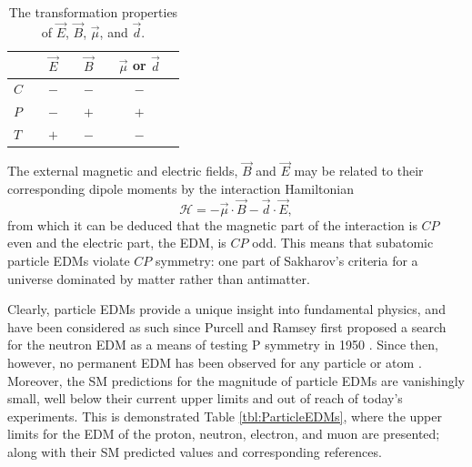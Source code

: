 \begin{table}[h!]
\centering
\begin{tabular}{l|ccc}
\hline
\hline
 & $\vec{E}\quad$ & $\vec{B}\quad$ & $\vec{\mu}$ or $\vec{d}\quad$ \\ 
\hline
 $C\quad$ & $-\quad$ & $-\quad$ & $-\quad$ \\ 
 $P\quad$ & $-\quad$ & $+\quad$ & $+\quad$ \\
 $T\quad$ & $+\quad$ & $-\quad$ & $-\quad$ \\
\hline
\hline
\end{tabular}
\caption{The transformation properties of $\vec{E}$, $\vec{B}$, $\vec{\mu}$, and $\vec{d}$.}
\label{tbl:CPT}
\end{table}

The external magnetic and electric fields, $\vec{B}$ and $\vec{E}$ may be related to their corresponding dipole moments by the interaction Hamiltonian
%
\begin{equation} 
  \mathcal{H} = -\vec{\mu}\cdot\vec{B}-\vec{d}\cdot\vec{E}, 
  \label{eqn:TotalHamiltonian1}
\end{equation}
%
from which it can be deduced that the magnetic part of the interaction is $CP$ even and the electric part, the EDM, is $CP$ odd. This means that subatomic particle EDMs violate $CP$ symmetry: one part of Sakharov's criteria \cite{Sakharov} for a universe dominated by matter rather than antimatter. 

Clearly, particle EDMs provide a unique insight into fundamental physics, and have been considered as such since Purcell and Ramsey first proposed a search for the neutron EDM as a means of testing P symmetry in 1950 \cite{PurcellAndRamsey}. Since then, however, no permanent EDM has been observed for any particle or atom \cite{ChuppEDMReview}. Moreover, the SM predictions for the magnitude of particle EDMs are vanishingly small, well below their current upper limits and out of reach of today's experiments. This is demonstrated Table \ref{tbl:ParticleEDMs}, where the upper limits for the EDM of the proton, neutron, electron, and muon are presented; along with their SM predicted values and corresponding references. 

